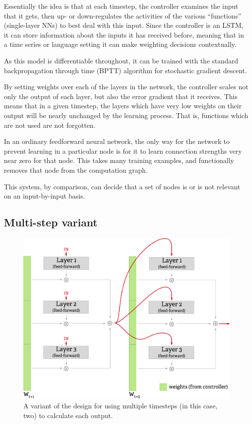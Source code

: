 \documentclass[]{article}
\begin{document}
Essentially the idea is that at each timestep, the controller examines
the input that it gets, then up- or down-regulates the activities of the
various ``functions'' (single-layer NNs) to best deal with this input.
Since the controller is an LSTM, it can store information about the
inputs it has received before, meaning that in a time series or language
setting it can make weighting decisions contextually.

As this model is differentiable throughout, it can be trained with the
standard backpropagation through time (BPTT) algorithm for stochastic
gradient descent.

By setting weights over each of the layers in the network, the
controller scales not only the output of each layer, but also the error
gradient that it receives. This means that in a given timestep, the
layers which have very low weights on their output will be nearly
unchanged by the learning process. That is, functions which are not used
are not forgotten.

In an ordinary feedforward neural network, the only way for the network
to prevent learning in a particular node is for it to learn connection
strengths very near zero for that node. This takes many training
examples, and functionally removes that node from the computation graph.

This system, by comparison, can decide that a set of nodes is or is not
relevant on an input-by-input basis.

\subsection{Multi-step variant}\label{multi-step-variant}

\begin{figure}[htbp]
\centering
\includegraphics{multistep_small.png}
\caption{\label{fig:multistep}A variant of the design for using multiple
timesteps (in this case, two) to calculate each output.}
\end{figure}
\end{document}
